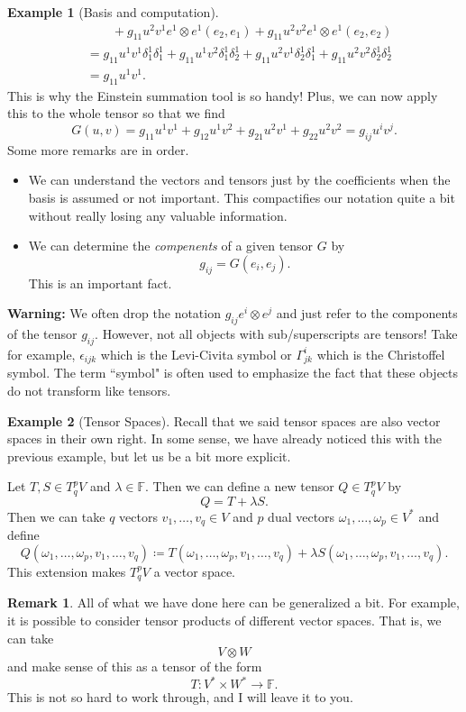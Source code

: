 \documentclass[12pt]{article}
\newcommand{\field}{\mathbb{F}}
\newcommand{\tspace}{T_q^pV}
\theoremstyle{definition}
\newtheorem{example}{Example}[section]
\newtheorem{remark}{Remark}[section]
\begin{document}
\begin{example}[Basis and computation]
\begin{align*}
    &\qquad +g_{11}u^2v^1e^1\otimes e^1(e_2, e_1)+g_{11}u^2v^2e^1\otimes e^1(e_2, e_2)\\[5pt]
    &= g_{11}u^1v^1\delta^1_1\delta^1_1 + g_{11}u^1v^2\delta^1_1\delta^1_2+g_{11}u^2v^1\delta^1_2\delta^1_1+g_{11}u^2v^2\delta^1_2\delta^1_2\\
    &= g_{11}u^1v^1.
\end{align*}
This is why the Einstein summation tool is so handy! Plus, we can now apply this to the whole tensor so that we find
\[
G(u,v)=g_{11}u^1v^1+g_{12}u^1v^2+g_{21}u^2v^1+g_{22}u^2v^2=g_{ij}u^iv^j.
\]
Some more remarks are in order.
\begin{itemize}
    \item We can understand the vectors and tensors just by the coefficients when the basis is assumed or not important.  This compactifies our notation quite a bit without really losing any valuable information.
    \item We can determine the \emph{compenents} of a given tensor $G$ by
    \[
    g_{ij}=G(e_i,e_j).
    \]
    This is an important fact.
\end{itemize}
\end{example}

\noindent \textbf{Warning:} We often drop the notation $g_{ij}e^i\otimes e^j$ and just refer to the components of the tensor $g_{ij}$.  However, not all objects with sub/superscripts are tensors!  Take for example, $\epsilon_{ijk}$ which is the Levi-Civita symbol or $\Gamma^i_{jk}$ which is the Christoffel symbol. The term ``symbol" is often used to emphasize the fact that these objects do not transform like tensors.

\begin{example}[Tensor Spaces]
Recall that we said tensor spaces are also vector spaces in their own right.  In some sense, we have already noticed this with the previous example, but let us be a bit more explicit. 

Let $T,S \in \tspace$ and $\lambda \in \field$.  Then we can define a new tensor $Q \in \tspace$ by
\[
Q=T+\lambda S.
\]
Then we can take $q$ vectors $v_1,\dots,v_q\in V$ and $p$ dual vectors $\omega_1,\dots,\omega_p\in V^*$ and define
\[
Q(\omega_1,\dots,\omega_p,v_1,\dots,v_q)\coloneqq T(\omega_1,\dots,\omega_p,v_1,\dots,v_q)+\lambda S(\omega_1,\dots,\omega_p,v_1,\dots,v_q).
\]
This extension makes $\tspace$ a vector space.
\end{example}

\begin{remark}
All of what we have done here can be generalized a bit.  For example, it is possible to consider tensor products of different vector spaces.  That is, we can take
\[
V\otimes W
\]
and make sense of this as a tensor of the form
\[
T\colon V^* \times W^* \to \field.
\]
This is not so hard to work through, and I will leave it to you. 
\end{remark}
\end{document}
